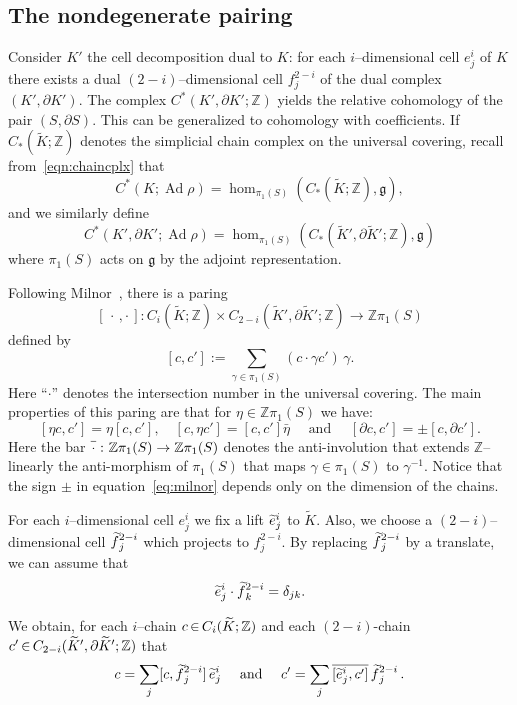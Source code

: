 \documentclass[11pt]{article}
\theoremstyle{definition}
\numberwithin{equation}{section}
\numberwithin{figure}{section}
\numberwithin{table}{section}
\DeclareMathOperator{\Ad}{Ad}
\newcommand{\Zbb}{\mathbb{Z}}
\newcommand{\gfrk}{\mathfrak{g}}
\newcommand*{\Mk}{\mkern -2mu}
\newcommand*{\mK}{\mkern 1mu}
\let\oldtilde\tilde
\renewcommand*{\tilde}[1]{\mathchoice{\widetilde{#1}}{\widetilde{#1}}{\oldtilde{#1}}{\oldtilde{#1}}}\let\oldhat\hat
\renewcommand*{\hat}[1]{\mathchoice{\widehat{#1}}{\widehat{#1}}{\oldhat{#1}}{\oldhat{#1}}}\let\oldforall\forall
\renewcommand*{\forall}{\mathrel{\oldforall}}
\begin{document}
\subsection{The nondegenerate pairing} Consider $K'$ the cell decomposition dual to $K$: for each $i$--dimensional cell $e^i_j$ of $K$ there exists a dual $(2-i)$--dimensional cell $f^{2-i}_j$ of the dual complex $(K',\partial K')$. The complex $C^*(K',\partial K';\Zbb)$ yields the relative cohomology of the pair $(S,\partial S)$. This can be generalized to cohomology with coefficients. If $C_*(\widetilde K;\Zbb)$ denotes the simplicial chain complex on the universal covering, recall from~\eqref{eqn:chaincplx} that
\[
C^*(K;\Ad\rho)=\hom_{\pi_1(S)}(C_*(\widetilde K;\Zbb), \gfrk),
\]
and we similarly define
\[
C^*(K',\partial K';\Ad\rho)=\hom_{\pi_1(S)}(C_*(\widetilde K',\partial\widetilde K' ;\Zbb), \gfrk)
\]
where $\pi_1(S)$ acts on $ \gfrk$ by the adjoint representation.


Following Milnor~\cite{MilnorDuality}, there is a paring
\[
[\,\cdot\,,\cdot\,]\colon C_i(\widetilde K;\Zbb)\times C_{2-i}(\widetilde K',\partial\widetilde K' ;\Zbb)\to \Zbb\pi_1(S)
\]
defined by
\[
[c,c'] := \sum_{\gamma\in\pi_1(S)} (c\cdot \gamma c')\,\gamma.
\]
Here ``$\cdot$'' denotes the intersection number in the universal covering. The main properties of this paring are that for $\eta\in\Zbb\pi_1(S)$ we have:
\begin{equation}\label{eq:milnor}
[\eta c,c'] = \eta [c,c'], \quad [c,\eta c'] = [c,c'] \bar \eta
\quad\text{ and }\quad [\partial c,c'] = \pm [c,\partial c'].
\end{equation}
Here the bar $\overline{\mK\cdot\vphantom{t}\mK}\,\colon\Zbb\pi_1(S)\to \Zbb\pi_1(S) $ denotes the anti-involution that extends $\Zbb$--linearly the anti-morphism of $\pi_1(S)$ that maps $\gamma\in\pi_1(S)$ to $\gamma^{-1}$. Notice that the sign $\pm$ in equation~\eqref{eq:milnor} depends only on the dimension of the chains.

For each $i$--dimensional cell $e^i_j$ we fix a lift $\tilde e^i_j$ to $\widetilde K$. Also, we choose a $(2-i)$--dimensional cell $\tilde f^{2-i}_j$ which projects to $f^{2-i}_j$. By replacing $\tilde f^{2-i}_j$ by a translate, we can assume that
\[
\tilde e^i_j \cdot \tilde f^{2-i}_k = \delta_{jk}.
\]

We obtain, for each $i$--chain $c\Mk\in\Mk C_i(\widetilde K ;\Zbb)$ and each $(2-i)$-chain $c'\Mk\in\Mk C_{2-i}(\widetilde K',\partial\widetilde K' ; \Zbb)$ that
\[
c = \sum_j [c, \tilde f^{2-i}_j] \,\tilde e^i_j
\quad\text{ and }\quad c' = \sum_j \overline{[\tilde e^i_j, c']}\, \tilde f^{2-i}_j\,.
\]
\end{document}
